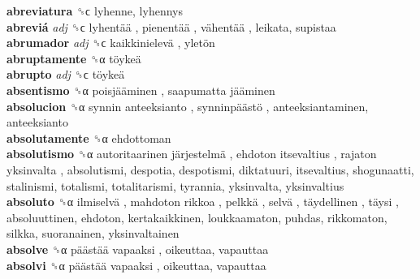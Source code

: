 \textbf{abreviatura} ␝ϲ  lyhenne, lyhennys  \\
\textbf{abreviá} \emph{adj}  ␝ϲ   lyhentää ,  pienentää ,  vähentää , leikata, supistaa  \\
\textbf{abrumador} \emph{adj}  ␝ϲ   kaikkinielevä ,  yletön   \\
\textbf{abruptamente} ␝α   töykeä   \\
\textbf{abrupto} \emph{adj}  ␝ϲ   töykeä   \\
\textbf{absentismo} ␝α   poisjääminen ,  saapumatta jääminen   \\
\textbf{absolucion} ␝α   synnin anteeksianto ,  synninpäästö , anteeksiantaminen, anteeksianto  \\
\textbf{absolutamente} ␝α  ehdottoman  \\
\textbf{absolutismo} ␝α   autoritaarinen järjestelmä ,  ehdoton itsevaltius ,  rajaton yksinvalta , absolutismi, despotia, despotismi, diktatuuri, itsevaltius, shogunaatti, stalinismi, totalismi, totalitarismi, tyrannia, yksinvalta, yksinvaltius  \\
\textbf{absoluto} ␝α   ilmiselvä ,  mahdoton  rikkoa ,  pelkkä ,  selvä ,  täydellinen ,  täysi , absoluuttinen, ehdoton, kertakaikkinen, loukkaamaton, puhdas, rikkomaton, silkka, suoranainen, yksinvaltainen  \\
\textbf{absolve} ␝α   päästää vapaaksi , oikeuttaa, vapauttaa  \\
\textbf{absolvi} ␝α   päästää vapaaksi , oikeuttaa, vapauttaa  \\
